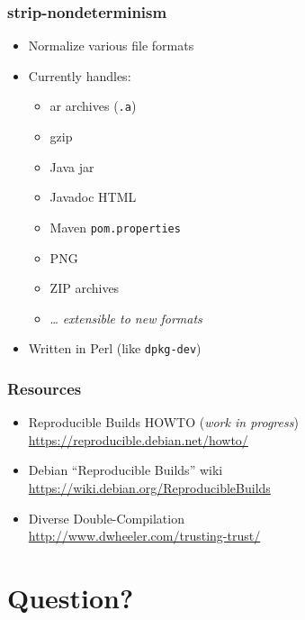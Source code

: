 \documentclass[14pt,aspectratio=169]{beamer}
\begin{document}
\begin{frame}
 \frametitle{strip-nondeterminism}

 \begin{itemize}
  \item Normalize various file formats
  \item Currently handles:
   \begin{itemize}
    \item ar archives (\texttt{.a})
    \item gzip
    \item Java jar
    \item Javadoc HTML
    \item Maven \texttt{pom.properties}
    \item PNG
    \item ZIP archives
    \item … \textit{extensible to new formats}
   \end{itemize}
  \item Written in Perl (like \texttt{dpkg-dev})
 \end{itemize}
\end{frame}

\begin{frame}
 \frametitle{Resources}

 \begin{itemize}
  \item Reproducible Builds HOWTO (\textit{work in progress})\\
   \url{https://reproducible.debian.net/howto/}
  \item Debian “Reproducible Builds” wiki \\
   \url{https://wiki.debian.org/ReproducibleBuilds}
  \item Diverse Double-Compilation \\
   \url{http://www.dwheeler.com/trusting-trust/}
 \end{itemize}
\end{frame}

\section{Question?}
\end{document}
